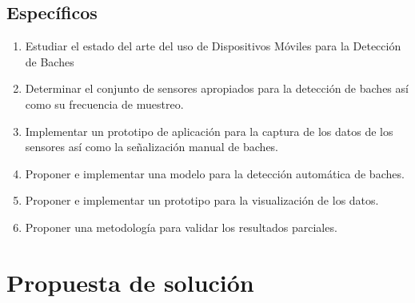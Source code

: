 \subsection*{Específicos}
\begin{enumerate}
		\item Estudiar el estado del arte del uso de Dispositivos Móviles para la Detección de Baches
		\item Determinar el conjunto de sensores apropiados para la detección de baches así como su 
frecuencia de muestreo. 
		\item Implementar un prototipo de aplicación para la captura de los datos de los sensores así 
como la señalización manual de baches. 
		\item Proponer e implementar una modelo para la detección automática de baches.
		\item Proponer e implementar un prototipo para la visualización de los datos.
		\item Proponer una metodología para validar los resultados parciales.

\end{enumerate}

\section*{Propuesta de solución}

